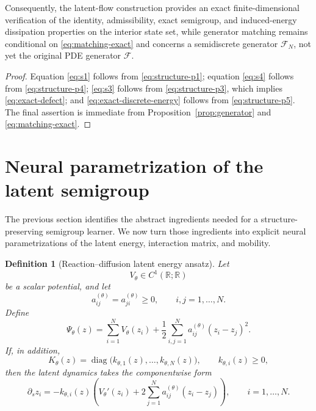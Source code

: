 \documentclass[11pt]{article}
\newtheorem{definition}{Definition}
\newcommand{\R}{\mathbb{R}}
\newcommand{\cF}{\mathcal{F}}
\newcommand{\cFN}{\mathcal{F}_N}
\newcommand{\diag}{\operatorname{diag}}
\begin{document}
Consequently, the latent-flow construction provides an exact finite-dimensional verification of the identity, admissibility, exact semigroup, and induced-energy dissipation properties on the interior state set, while generator matching remains conditional on \eqref{eq:matching-exact} and concerns a semidiscrete generator \(\cFN\), not yet the original PDE generator \(\cF\).

\begin{proof}
Equation \eqref{eq:s1} follows from \eqref{eq:structure-p1}; equation \eqref{eq:s4} follows from \eqref{eq:structure-p4}; \eqref{eq:s3} follows from \eqref{eq:structure-p3}, which implies \eqref{eq:exact-defect}; and \eqref{eq:exact-discrete-energy} follows from \eqref{eq:structure-p5}. The final assertion is immediate from Proposition~\ref{prop:generator} and \eqref{eq:matching-exact}.
\end{proof}

\section{Neural parametrization of the latent semigroup}\label{sec:neural-param}
The previous section identifies the abstract ingredients needed for a structure-preserving semigroup learner. We now turn those ingredients into explicit neural parametrizations of the latent energy, interaction matrix, and mobility.
\begin{definition}[Reaction--diffusion latent energy ansatz]\label{def:rd-energy}
Let
\begin{equation}\label{eq:V-type}
V_{\theta}\in C^1(\R;\R)
\end{equation}
be a scalar potential, and let
\begin{equation}\label{eq:A-sym}
a_{ij}^{(\theta)}=a_{ji}^{(\theta)}\ge 0, \qquad i,j=1,\dots,N.
\end{equation}
Define
\begin{equation}\label{eq:rd-energy}
\Psi_{\theta}(z)=\sum_{i=1}^N V_{\theta}(z_i)+\frac12\sum_{i,j=1}^N a_{ij}^{(\theta)}(z_i-z_j)^2.
\end{equation}
If, in addition,
\begin{equation}\label{eq:diag-mobility}
K_{\theta}(z)=\diag\bigl(k_{\theta,1}(z),\dots,k_{\theta,N}(z)\bigr), \qquad k_{\theta,i}(z)\ge 0,
\end{equation}
then the latent dynamics takes the componentwise form
\begin{equation}\label{eq:component-flow}
\partial_s z_i=-k_{\theta,i}(z)\left(V_{\theta}'(z_i)+2\sum_{j=1}^N a_{ij}^{(\theta)}(z_i-z_j)\right), \qquad i=1,\dots,N.
\end{equation}
\end{definition}
\end{document}
